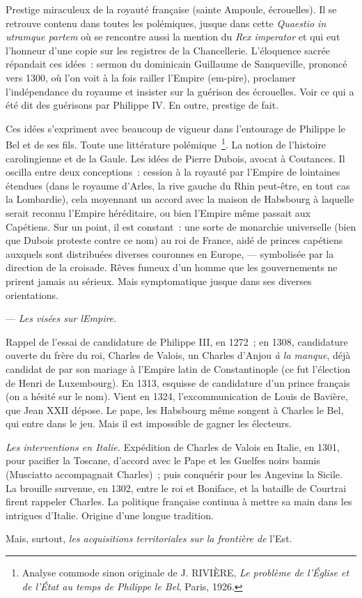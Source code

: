 \documentclass[french,twoside]{book} %
\begin{document}
Prestige miraculeux de la royauté française (sainte Ampoule, écrouelles). Il se retrouve contenu dans toutes les polémiques, jusque dans cette {\itshape Quaestio in utramque partem} où se rencontre aussi la mention du {\itshape Rex imperator} et qui eut l’honneur d’une copie sur les registres de la Chancellerie. L’éloquence sacrée répandait ces idées : sermon du dominicain Guillaume de Sanqueville, prononcé vers 1300, où l’on voit à la fois railler l’Empire (em-pire), proclamer l’indépendance du royaume et insister sur la guérison des écrouelles. Voir ce qui a été dit des guérisons par Philippe IV. En outre, prestige de fait.\par
Ces idées s’expriment avec beaucoup de vigueur dans l’entourage de Philippe le Bel et de ses fils. Toute une littérature polémique \footnote{ Analyse commode sinon originale de J. RIVIÈRE, {\itshape Le problème de l’Église et de l’État au temps de Philippe le Bel}, Paris, 1926.}. La notion de l’histoire carolingienne et de la Gaule. Les idées de Pierre Dubois, avocat à Coutances. Il oscilla entre deux conceptions : cession à la royauté par l’Empire de lointaines étendues (dans le  
\label{p33} royaume d’Arles, la rive gauche du Rhin peut-être, en tout cas la Lombardie), cela moyennant un accord avec la maison de Habsbourg à laquelle serait reconnu l’Empire héréditaire, ou bien l’Empire même passait aux Capétiens. Sur un point, il est constant : une sorte de monarchie universelle (bien que Dubois proteste contre ce nom) au roi de France, aidé de princes capétiens auxquels sont distribuées diverses couronnes en Europe, — symbolisée par la direction de la croisade. Rêves fumeux d’un homme que les gouvernements ne prirent jamais au sérieux. Mais symptomatique jusque dans ses diverses orientations.\par
— {\itshape Les visées sur lEmpire.}\par
Rappel de l’essai de candidature de Philippe III, en 1272 ; en 1308, candidature ouverte du frère du roi, Charles de Valois, un Charles d’Anjou \emph{à la manque}, déjà candidat de par son mariage à l’Empire latin de Constantinople (ce fut l’élection de Henri de Luxembourg). En 1313, esquisse de candidature d’un prince français (on a hésité sur le nom). Vient en 1324, l’excommunication de Louis de Bavière, que Jean XXII dépose. Le pape, les Habsbourg même songent à Charles le Bel, qui entre dans le jeu. Mais il est impossible de gagner les électeurs.\par
{\itshape Les interventions en Italie.} Expédition de Charles de Valois en Italie, en 1301, pour pacifier la Toscane, d’accord avec le Pape et les Guelfes noirs bannis (Musciatto accompagnait Charles) ; puis conquérir pour les Angevins la Sicile. La brouille survenue, en 1302, entre le roi et Boniface, et la bataille de Courtrai firent rappeler Charles. La politique française continua à mettre sa main dans les intrigues d’Italie. Origine d’une longue tradition.\par
Mais, surtout, {\itshape les acquisitions territoriales sur la frontière de} l’Est.\par
\end{document}
